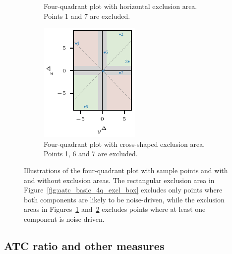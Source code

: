 \documentclass[pdflatex]{sn-jnl}
\theoremstyle{plain}%
\theoremstyle{definition}
\begin{document}
\begin{figure}
\begin{subfigure}[t]{.24\textwidth}
\caption{Four-quadrant plot with horizontal exclusion area. Points 1 and 7 are excluded.} \label{fig:aatc_basic_4q_excl_axis}
\end{subfigure}\hspace{0.01\textwidth}%
\begin{subfigure}[t]{.24\textwidth}
\includegraphics{plots/illustrative_examples/4q_excl_cross}
\caption{Four-quadrant plot with cross-shaped exclusion area. Points 1, 6 and 7 are excluded.}\label{fig:aatc_basic_4q_excl_cross}
\end{subfigure}%
\caption{Illustrations of the four-quadrant plot with sample points and with and without exclusion areas. The rectangular exclusion area in Figure~\ref{fig:aatc_basic_4q_excl_box} excludes only points where both components are likely to be noise-driven, while the exclusion areas in Figures~\ref{fig:aatc_basic_4q_excl_axis} and~\ref{fig:aatc_basic_4q_excl_cross} excludes points where at least one component is noise-driven. }
\label{fig:aatc_4q}
\end{figure}

\subsection{ATC ratio and other measures}\label{subsec:atc-measures}
\end{document}
